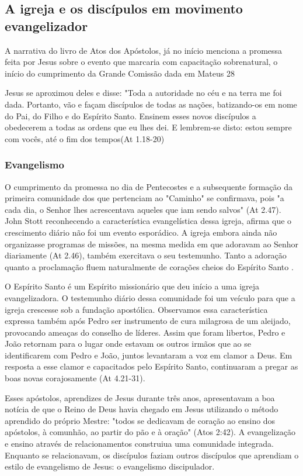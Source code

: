 \documentclass[
	12pt,				%
	openright,			%
	twoside,			%
	a4paper,			%
	english,			%
	french,				%
	spanish,			%
	brazil				%
	]{abntex2}
\begin{document}
\subsection{A igreja e os discípulos em movimento evangelizador}

A narrativa do livro de Atos dos Apóstolos, já no início menciona a promessa feita por Jesus sobre o evento que marcaria com capacitação sobrenatural, o início do cumprimento da Grande Comissão dada em Mateus 28
\begin{citacao}
Jesus se aproximou deles e disse: "Toda a autoridade no céu e na terra me foi dada. Portanto, vão e façam discípulos de todas as nações, batizando-os em nome do Pai, do Filho e do Espírito Santo. Ensinem esses novos discípulos a obedecerem a todas as ordens que eu lhes dei. E lembrem-se disto: estou sempre com vocês, até o fim dos tempos(At 1.18-20)
\end{citacao}

\subsubsection{Evangelismo}

O cumprimento da promessa no dia de Pentecostes e a subsequente formação da primeira comunidade dos que pertenciam ao "Caminho" se confirmava, pois "a cada dia, o Senhor lhes acrescentava aqueles que iam sendo salvos" (At 2.47). John Stott reconhecendo a característica evangelística dessa igreja, afirma que o crescimento diário não foi um evento esporádico. A igreja embora ainda não organizasse programas de missões, na mesma medida em que adoravam ao Senhor diariamente (At 2.46), também exercitava o seu testemunho. Tanto a adoração quanto a proclamação fluem naturalmente de corações cheios do Espírito Santo \cite[118-119]{stott}. 

O Espírito Santo é um Espírito missionário que deu início a uma igreja evangelizadora. O testemunho diário dessa comunidade foi um veículo para que a igreja crescesse \cite[78]{stott} sob a fundação apostólica. Observamos essa característica expressa também após Pedro ser instrumento de cura milagrosa de um aleijado, provocando ameaças do conselho de líderes. Assim que foram libertos, Pedro e João retornam para o lugar onde estavam os outros irmãos que ao se identificarem com Pedro e João, juntos levantaram a voz em clamor a Deus. Em resposta a esse clamor e capacitados pelo Espírito Santo, continuaram a pregar as boas novas corajosamente (At 4.21-31).

Esses apóstolos, aprendizes de Jesus durante três anos, apresentavam a boa notícia de que o Reino de Deus havia chegado em Jesus utilizando o método aprendido do próprio Mestre: "todos se dedicavam de coração ao ensino dos apóstolos, à comunhão, ao partir do pão e à oração" (Atos 2:42). A evangelização e ensino através de relacionamentos construiua uma comunidade integrada. Enquanto se relacionavam, os discípulos faziam outros discípulos que aprendiam o estilo de evangelismo de Jesus: o evangelismo discipulador.
\end{document}
